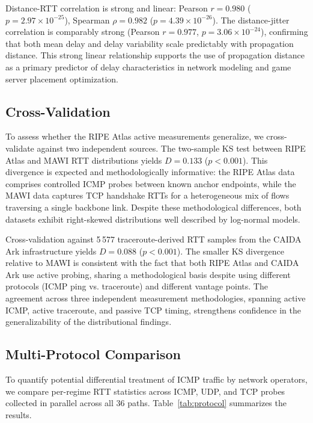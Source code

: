 \documentclass[conference]{IEEEtran}
\begin{document}
Distance-RTT correlation is strong and linear: Pearson $r = 0.980$ ($p = 2.97 \times 10^{-25}$), Spearman $\rho = 0.982$ ($p = 4.39 \times 10^{-26}$). The distance-jitter correlation is comparably strong (Pearson $r = 0.977$, $p = 3.06 \times 10^{-24}$), confirming that both mean delay and delay variability scale predictably with propagation distance. This strong linear relationship supports the use of propagation distance as a primary predictor of delay characteristics in network modeling and game server placement optimization.

\subsection{Cross-Validation}

To assess whether the RIPE Atlas active measurements generalize, we cross-validate against two independent sources. The two-sample KS test between RIPE Atlas and MAWI RTT distributions yields $D = 0.133$ ($p < 0.001$). This divergence is expected and methodologically informative: the RIPE Atlas data comprises controlled ICMP probes between known anchor endpoints, while the MAWI data captures TCP handshake RTTs for a heterogeneous mix of flows traversing a single backbone link. Despite these methodological differences, both datasets exhibit right-skewed distributions well described by log-normal models.

Cross-validation against 5\,577 traceroute-derived RTT samples from the CAIDA Ark infrastructure yields $D = 0.088$ ($p < 0.001$). The smaller KS divergence relative to MAWI is consistent with the fact that both RIPE Atlas and CAIDA Ark use active probing, sharing a methodological basis despite using different protocols (ICMP ping vs. traceroute) and different vantage points. The agreement across three independent measurement methodologies, spanning active ICMP, active traceroute, and passive TCP timing, strengthens confidence in the generalizability of the distributional findings.

\subsection{Multi-Protocol Comparison}

To quantify potential differential treatment of ICMP traffic by network operators, we compare per-regime RTT statistics across ICMP, UDP, and TCP probes collected in parallel across all 36 paths. Table~\ref{tab:protocol} summarizes the results.
\end{document}
